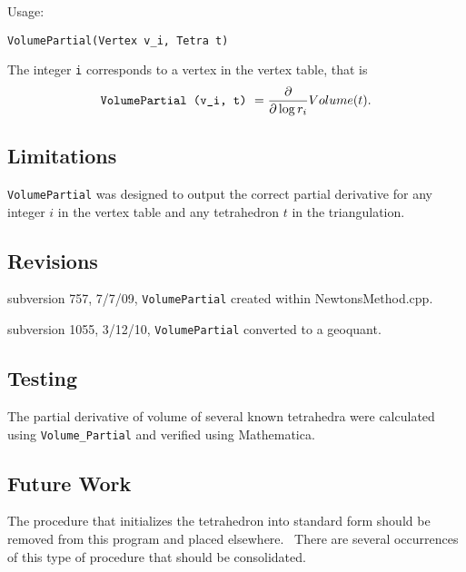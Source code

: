 Usage:

\texttt{VolumePartial(Vertex v\_i, Tetra t)}

The integer \texttt{i} corresponds to a vertex in the vertex table, that is%
\begin{equation*}
\text{\texttt{VolumePartial (v\_i, t)} }=\frac{\partial }{\partial \log r_{i}%
}Volume(t).
\end{equation*}

\subsection*{Limitations}

\texttt{VolumePartial} was designed to output the correct partial derivative
for any integer $i$ in the vertex table and any tetrahedron $t$ in the
triangulation. \ 

\subsection*{Revisions}

subversion 757, 7/7/09, \texttt{VolumePartial} created within
NewtonsMethod.cpp.

subversion 1055, 3/12/10, \texttt{VolumePartial} converted to a geoquant.

\subsection*{Testing}

The partial derivative of volume of several known tetrahedra were calculated
using \texttt{Volume\_Partial} and verified using Mathematica.

\subsection*{Future Work}

The procedure that initializes the tetrahedron into standard form should be
removed from this program and placed elsewhere. \ There are several
occurrences of this type of procedure that should be consolidated. \ 
